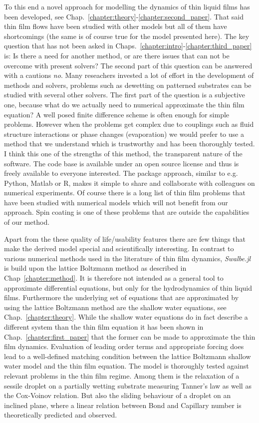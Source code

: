 To this end a novel approach for modelling the dynamics of thin liquid films has been developed, see Chap.~\ref{chapter:theory}-\ref{chapter:second_paper}.
That said thin film flows have been studied with other models but all of them have shortcomings (the same is of course true for the model presented here).
The key question that has not been asked in Chaps.~\ref{chapter:intro}-\ref{chapter:third_paper} is: Is there a need for another method, or are there issues that can not be overcome with present solvers? 
The second part of this question can be answered with a cautions \textit{no}.
Many reseachers invested a lot of effort in the development of methods and solvers, problems such as dewetting on patterned substrates can be studied with several other solvers.
The first part of the question is a subjective one, because what do we actually need to numerical approximate the thin film equation?
A well posed finite difference scheme is often enough for simple problems.
However when the problems get complex due to couplings such as fluid structure interactions or phase changes (evaporation) we would prefer to use a method that we understand which is trustworthy and has been thoroughly tested. 
I think this one of the strengths of this method, the transparent nature of the software. 
The code base is available under an open source license and thus is freely available to everyone interested.
The package approach, similar to e.g. Python, Matlab or R, makes it simple to share and collaborate with colleagues on numerical experiments.
Of course there is a long list of thin film problems that have been studied with numerical models which will not benefit from our approach.
Spin coating is one of these problems that are outside the capabilities of our method.  

Apart from the these quality of life/usability features there are few things that make the derived model special and scientifically interesting.
In contrast to various numerical methods used in the literature of thin film dynamics, \textit{Swalbe.jl} is build upon the lattice Boltzmann method as described in Chap~\ref{chapter:method}.
It is therefore not intended as a general tool to approximate differential equations, but only for the hydrodynamics of thin liquid films.
Furthermore the underlying set of equations that are approximated by using the lattice Boltzmann method are the shallow water equations, see Chap.~\ref{chapter:theory}.
While the shallow water equations do in fact describe a different system than the thin film equation it has been shown in Chap.~\ref{chapter:first_paper} that the former can be made to approximate the thin film dynamics.
Evaluation of leading order terms and appropriate forcing does lead to a well-defined matching condition between the lattice Boltzmann shallow water model and the thin film equation.
The model is thoroughly tested against relevant problems in the thin film regime. 
Among them is the relaxation of a sessile droplet on a partially wetting substrate measuring Tanner's law as well as the Cox-Voinov relation.
But also the sliding behaviour of a droplet on an inclined plane, where a linear relation between Bond and Capillary number is theoretically predicted and observed.

